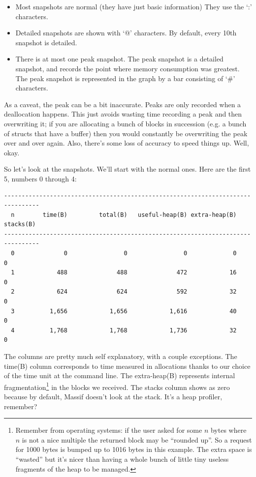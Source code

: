 \begin{itemize}
\item Most snapshots are normal (they have just basic information) They use the `:' characters.

\item Detailed snapshots are shown with `@' characters.  By default, every 10th snapshot is detailed.

\item There is at most one peak snapshot. The peak snapshot is a detailed snapshot, and records the point where memory consumption was greatest. The peak snapshot is represented in the graph by a bar consisting of `\#' characters.
\end{itemize}

As a caveat, the peak can be a bit inaccurate. Peaks are only recorded when a deallocation happens. This just avoids wasting time recording a peak and then overwriting it; if you are allocating a bunch of blocks in succession (e.g. a bunch of structs that have a buffer) then you would constantly be overwriting the peak over and over again. Also, there's some loss of accuracy to speed things up. Well, okay.

So let's look at the snapshots. We'll start with the normal ones. Here are the first 5, numbers 0 through 4:

{\scriptsize
\begin{verbatim}
--------------------------------------------------------------------------------
  n        time(B)         total(B)   useful-heap(B) extra-heap(B)    stacks(B)
--------------------------------------------------------------------------------
  0              0                0                0             0            0
  1            488              488              472            16            0
  2            624              624              592            32            0
  3          1,656            1,656            1,616            40            0
  4          1,768            1,768            1,736            32            0
\end{verbatim}
}

The columns are pretty much self explanatory, with a couple exceptions. The time(B) column corresponds to time measured in allocations thanks to our choice of the time unit at the command line. The extra-heap(B) represents internal fragmentation\footnote{Remember from operating systems: if the user asked for some $n$ bytes where $n$ is not a nice multiple the returned block may be ``rounded up''. So a request for 1000 bytes is bumped up to 1016 bytes in this example. The extra space is ``wasted'' but it's nicer than having a whole bunch of little tiny useless fragments of the heap to be managed.} in the blocks we received. The stacks column shows as zero because by default, Massif doesn't look at the stack. It's a heap profiler, remember?

